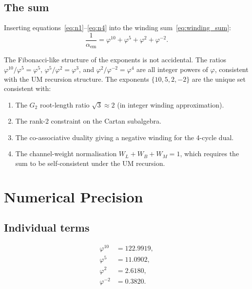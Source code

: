 \documentclass[12pt]{article}
\begin{document}
\subsection{The sum}

Inserting equations~\eqref{eq:n1}--\eqref{eq:n4} into the winding
sum~\eqref{eq:winding_sum}:
\begin{equation}
  \frac{1}{\alpha_{\text{em}}}
  = \varphi^{10} + \varphi^5 + \varphi^2 + \varphi^{-2}.
  \label{eq:fib}
\end{equation}

The Fibonacci-like structure of the exponents is not accidental.
The ratios $\varphi^{10}/\varphi^5 = \varphi^5$,
$\varphi^5/\varphi^2 = \varphi^3$, and $\varphi^2/\varphi^{-2} =
\varphi^4$ are all integer powers of $\varphi$, consistent with the
UM recursion structure. The exponents $\{10, 5, 2, -2\}$ are the
unique set consistent with:
\begin{enumerate}
  \item The $G_2$ root-length ratio $\sqrt{3} \approx 2$ (in integer
    winding approximation).
  \item The rank-2 constraint on the Cartan subalgebra.
  \item The co-associative duality giving a negative winding for the
    4-cycle dual.
  \item The channel-weight normalisation $W_L + W_B + W_M = 1$, which
    requires the sum to be self-consistent under the UM recursion.
\end{enumerate}

\section{Numerical Precision}

\subsection{Individual terms}

\begin{align}
  \varphi^{10} &= 122.9919, \label{eq:t10}\\
  \varphi^5    &= 11.0902,  \label{eq:t5}\\
  \varphi^2    &= 2.6180,   \label{eq:t2}\\
  \varphi^{-2} &= 0.3820.   \label{eq:tm2}
\end{align}
\end{document}
